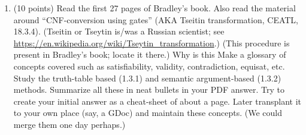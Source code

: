 \documentclass[11pt]{article}
\begin{document}

\begin{enumerate}
\item (10 points) Read the first 27 pages of Bradley's book.
  Also read the material around ``CNF-conversion using gates'' (AKA Tseitin transformation,
  CEATL, 18.3.4).
  (Tseitin or Tseytin is/was a Russian scientist; see
  \url{https://en.wikipedia.org/wiki/Tseytin_transformation}.)
  (This procedure is present in Bradley's book; locate it there.)
  Why is this 
  Make a glossary of concepts covered
  such as satisfiability, validity, contradiction, equisat, etc. Study the truth-table based
  (1.3.1) and semantic argument-based (1.3.2) methods. Summarize all these in neat bullets
  in your PDF answer.
  Try to create your initial answer as a cheat-sheet of about a page. Later transplant it
  to your own place (say, a GDoc) and maintain these concepts. (We could merge them one day perhaps.)




\newlength{\minpagw}
\settowidth{\minpagw}{\hspace{40em}}

\begin{minipage}{\minpagw}
\end{minipage}
\end{enumerate}
\end{document}
